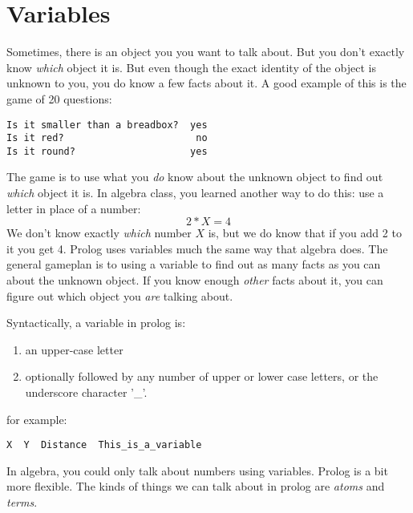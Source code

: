 \documentclass{book}[9pt]
\begin{document}
\section{Variables}

Sometimes, there is an object you you want to talk about.  But you
don't exactly know {\em which} object it is.  But even though the
exact identity of the object is unknown to you, you do know a few
facts about it.  A good example of this is the game of 20 questions:
\begin{verbatim}
Is it smaller than a breadbox?  yes
Is it red?                       no
Is it round?                    yes
\end{verbatim}
\noindent The game is to use what you {\em do} know about the unknown
object to find out {\em which} object it is.  In algebra class, you
learned another way to do this: use a letter in place of a number:
\begin{displaymath}
2*X=4
\end{displaymath}
\noindent We don't know exactly {\em which} number $X$ is, but we do
know that if you add 2 to it you get 4.  Prolog uses variables much
the same way that algebra does.  The general gameplan is to using a
variable to find out as many facts as you can about the unknown object.
If you know enough {\em other} facts about it, you can figure out which
object you {\em are} talking about.

Syntactically, a variable in prolog is:
\begin{enumerate}
\item an  upper-case letter
\item optionally followed by any number of upper or lower case letters,
or the underscore character '\_'. 
\end{enumerate}
\noindent for example:
\begin{verbatim}
X  Y  Distance  This_is_a_variable
\end{verbatim}

In algebra, you could only talk about numbers using variables.  Prolog
is a bit more flexible.  The kinds of things we can talk about in
prolog are {\em atoms} and {\em terms}.
\end{document}
